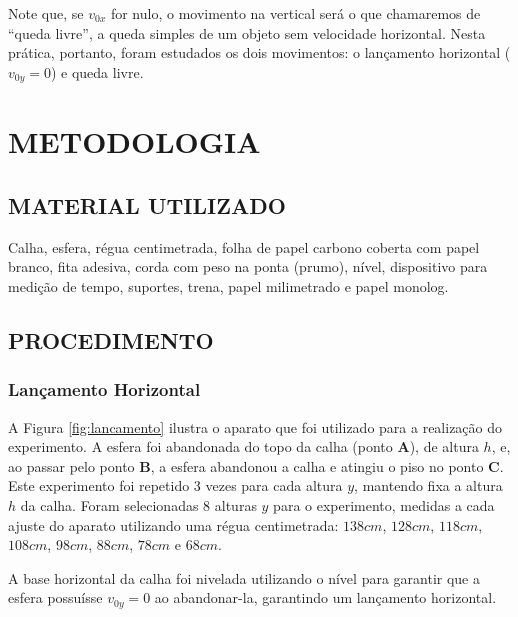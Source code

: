 \documentclass[10pt]{article}
\begin{document}
Note que, se $v_{0x}$ for nulo, o movimento na vertical será o que chamaremos de ``queda livre'', a queda simples de um objeto sem velocidade horizontal. Nesta prática, portanto, foram estudados os dois movimentos: o lançamento horizontal ($v_{0y} = 0$) e queda livre.

\section{METODOLOGIA}

\subsection{MATERIAL UTILIZADO}

Calha, esfera, régua centimetrada, folha de papel carbono coberta com papel branco, fita adesiva, corda com peso na ponta (prumo), nível, dispositivo para medição de tempo, suportes, trena, papel milimetrado e papel monolog.

\subsection{PROCEDIMENTO}

\subsubsection{Lançamento Horizontal}
A Figura \ref{fig:lancamento} ilustra o aparato que foi utilizado para a realização do experimento. A esfera foi abandonada do topo da calha (ponto \textbf{A}), de altura $h$, e, ao passar pelo ponto \textbf{B}, a esfera abandonou a calha e atingiu o piso no ponto \textbf{C}. Este experimento foi repetido 3 vezes para cada altura $y$, mantendo fixa a altura $h$ da calha. Foram selecionadas 8 alturas $y$ para o experimento, medidas a cada ajuste do aparato utilizando uma régua centimetrada: $138cm$, $128cm$, $118cm$, $108cm$, $98cm$, $88cm$, $78cm$ e $68cm$.

A base horizontal da calha foi nivelada utilizando o nível para garantir que a esfera possuísse $v_{0y} = 0$ ao abandonar-la, garantindo um lançamento horizontal.
\end{document}
